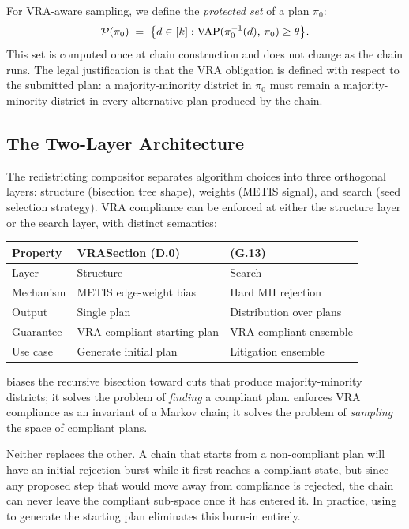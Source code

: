 For VRA-aware sampling, we define the \emph{protected set} of a plan $\pi_0$:
\[
  \mathcal{P}(\pi_0) \;=\; \bigl\{d \in [k] : \mathrm{VAP}(\pi_0^{-1}(d),\, \pi_0) \geq \theta\bigr\}.
\]
This set is computed once at chain construction and does not change as the
chain runs.
The legal justification is that the VRA obligation is defined with respect to
the submitted plan: a majority-minority district in $\pi_0$ must remain a
majority-minority district in every alternative plan produced by the chain.

\subsection{The Two-Layer Architecture}

The redistricting compositor separates algorithm choices into three orthogonal
layers: structure (bisection tree shape), weights (METIS signal), and search
(seed selection strategy).
VRA compliance can be enforced at either the structure layer or the search
layer, with distinct semantics:

\begin{center}
\begin{tabular}{lll}
\toprule
\textbf{Property} & \textbf{VRASection (D.0)} & \textbf{\vr{} (G.13)} \\
\midrule
Layer & Structure & Search \\
Mechanism & METIS edge-weight bias & Hard MH rejection \\
Output & Single plan & Distribution over plans \\
Guarantee & VRA-compliant starting plan & VRA-compliant ensemble \\
Use case & Generate initial plan & Litigation ensemble \\
\bottomrule
\end{tabular}
\end{center}

\noindent
\vraSection{} biases the recursive bisection toward cuts that produce
majority-minority districts; it solves the problem of \emph{finding} a
compliant plan.
\vr{} enforces VRA compliance as an invariant of a Markov chain; it solves
the problem of \emph{sampling} the space of compliant plans.

Neither replaces the other.
A chain that starts from a non-compliant plan will have an initial rejection
burst while it first reaches a compliant state, but since any proposed step
that would move away from compliance is rejected, the chain can never leave
the compliant sub-space once it has entered it.
In practice, using \vraSection{} to generate the starting plan eliminates this
burn-in entirely.

